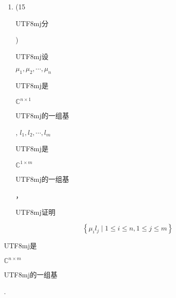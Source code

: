 \documentclass[10pt]{article}
\begin{document}
\begin{enumerate}
  \item (15 \begin{CJK}{UTF8}{mj}分\end{CJK}) \begin{CJK}{UTF8}{mj}设\end{CJK} $\mu_{1}, \mu_{2}, \cdots, \mu_{n}$ \begin{CJK}{UTF8}{mj}是\end{CJK} $\mathbb{C}^{n \times 1}$ \begin{CJK}{UTF8}{mj}的一组基\end{CJK}, $l_{1}, l_{2}, \cdots, l_{m}$ \begin{CJK}{UTF8}{mj}是\end{CJK} $\mathbb{C}^{1 \times m}$ \begin{CJK}{UTF8}{mj}的一组基\end{CJK}，\begin{CJK}{UTF8}{mj}证明\end{CJK}

\end{enumerate}
$$
\left\{\mu_{i} l_{j} \mid 1 \leq i \leq n, 1 \leq j \leq m\right\}
$$
\begin{CJK}{UTF8}{mj}是\end{CJK} $\mathbb{C}^{n \times m}$ \begin{CJK}{UTF8}{mj}的一组基\end{CJK}.
\end{document}
